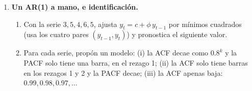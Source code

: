 \documentclass[11pt]{article}
\newcommand{\espacio}[1]{\par\vspace{#1}}
\begin{document}
\begin{enumerate}
\begin{enumerate}
  \item Un modelo nuevo obtiene MASE de 0.9 en estos cuatro trimestres de prueba. «Es menor que 1, así que le gana a la referencia estacional», dice su autor. ¿Tiene razón? ¿Qué modelo usarías?
  \espacio{2cm}
\end{enumerate}

\item \textbf{Un AR(1) a mano, e identificación.}
\begin{enumerate}
  \item Con la serie $3, 5, 4, 6, 5$, ajusta $y_t = c + \phi\, y_{t-1}$ por mínimos cuadrados (usa los cuatro pares $(y_{t-1}, y_t)$) y pronostica el siguiente valor.
  \espacio{3.5cm}

  \item Para cada serie, propón un modelo: (i) la ACF decae como $0.8^k$ y la PACF solo tiene una barra, en el rezago 1; (ii) la ACF solo tiene barras en los rezagos 1 y 2 y la PACF decae; (iii) la ACF apenas baja: $0.99, 0.98, 0.97, \dots$
  \espacio{2.5cm}
\end{enumerate}

\end{enumerate}
\end{document}
